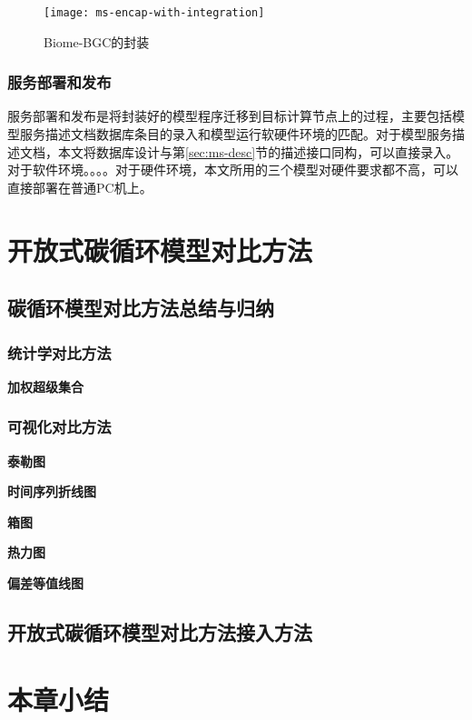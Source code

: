 \begin{figure}[!htbp]
    \centering
    \texttt{[image: ms-encap-with-integration]}
    \caption{Biome-BGC的封装}
    \label{fig:ms-encap-with-integration}
\end{figure}

\subsubsection{服务部署和发布}
服务部署和发布是将封装好的模型程序迁移到目标计算节点上的过程，主要包括模型服务描述文档数据库条目的录入和模型运行软硬件环境的匹配。对于模型服务描述文档，本文将数据库设计与第\ref{sec:ms-desc}节的描述接口同构，可以直接录入。对于软件环境。。。。对于硬件环境，本文所用的三个模型对硬件要求都不高，可以直接部署在普通PC机上。

\section{开放式碳循环模型对比方法}

\subsection{碳循环模型对比方法总结与归纳}
\subsubsection{统计学对比方法}
\textbf{加权超级集合}

\subsubsection{可视化对比方法}
\textbf{泰勒图}

\textbf{时间序列折线图}

\textbf{箱图}

\textbf{热力图}

\textbf{偏差等值线图}

\subsection{开放式碳循环模型对比方法接入方法}

\section{本章小结}
